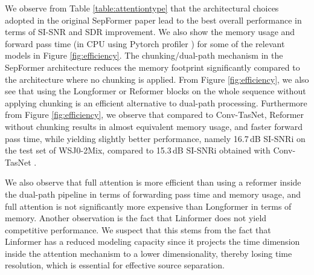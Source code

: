 \documentclass[lettersize,journal]{IEEEtran}
\begin{document}
We observe from Table \ref{table:attentiontype} that the architectural choices adopted in the original SepFormer paper lead to the best overall performance in terms of SI-SNR and SDR improvement. We also show the memory usage and forward pass time (in CPU using Pytorch profiler \cite{pytorch-profiler}) for some of the relevant models in Figure \ref{fig:efficiency}. The chunking/dual-path mechanism in the SepFormer architecture reduces the memory footprint significantly compared to the architecture where no chunking is applied. From Figure \ref{fig:efficiency}, we also see that using the Longformer or Reformer blocks on the whole sequence without applying chunking is an efficient alternative to dual-path processing. Furthermore from Figure \ref{fig:efficiency}, we observe that compared to Conv-TasNet, Reformer without chunking results in almost equivalent memory usage, and faster forward pass time, while yielding slightly better performance, namely 16.7\,dB SI-SNRi on the test set of WSJ0-2Mix, compared to 15.3\,dB SI-SNRi obtained with Conv-TasNet \cite{luo2018convtasnet}.  



We also observe that full attention is more efficient than using a reformer inside the dual-path pipeline in terms of forwarding pass time and memory usage, and full attention is not significantly more expensive than Longformer in terms of memory. Another observation is the fact that Linformer does not yield competitive performance. We suspect that this stems from the fact that Linformer has a reduced modeling capacity since it projects the time dimension inside the attention mechanism to a lower dimensionality, thereby losing time resolution, which is essential for effective source separation. 



\end{document}
